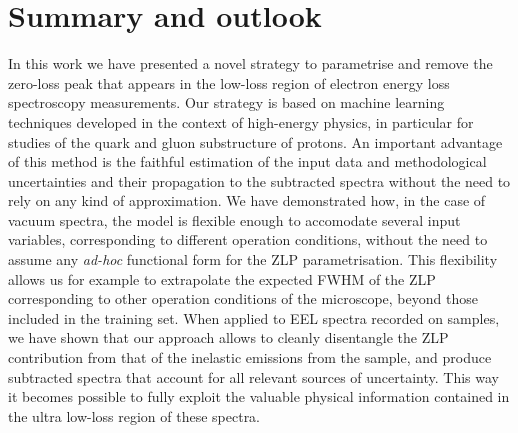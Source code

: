 \section{Summary and outlook}
\label{sec:summary}

In this work we have presented a novel strategy to parametrise and remove
the zero-loss peak that appears in the low-loss region
of electron energy loss spectroscopy measurements.
%
Our strategy is based on machine learning techniques developed
in the context of high-energy physics, in particular for studies of the quark
and gluon substructure of protons.
%
An important advantage of this method is the faithful estimation of the
input data and methodological uncertainties and their propagation to the subtracted
spectra without the need to rely on any kind of approximation.
%
We have demonstrated how, in the case of vacuum spectra, the model
is flexible enough to accomodate several input variables, corresponding
to different operation conditions,  without the need to
assume any {\it ad-hoc} functional form for the ZLP parametrisation.
%
This flexibility allows us for example to extrapolate the expected FWHM of the ZLP
corresponding to other operation conditions of the microscope, beyond those
included in the training set.
%
When applied to EEL spectra recorded on samples, we have shown
that our approach allows to cleanly disentangle the ZLP contribution from
that of the inelastic emissions from the sample, and produce
subtracted spectra  that account for all relevant sources of uncertainty.
%
This way it becomes possible to fully exploit
the valuable physical information contained in the ultra low-loss region of
these spectra.

